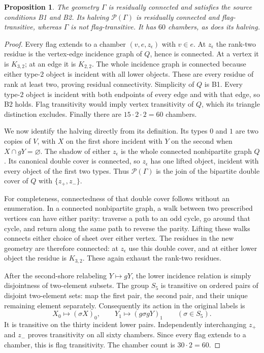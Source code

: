 \documentclass[11pt,a4paper]{article}
\newtheorem{proposition}[lemma]{Proposition}
\begin{document}
\begin{proposition}\label{example}
The geometry $\Gamma$ is residually connected and satisfies the
source conditions B1 and B2. Its halving $\mathcal P(\Gamma)$ is
residually connected and flag-transitive, whereas $\Gamma$ is not
flag-transitive. It has $60$ chambers, as does its halving.
\end{proposition}
\begin{proof}
Every flag extends to a chamber $(v,e,z_\epsilon)$ with $v\in e$.
At $z_\epsilon$ the rank-two residue is the vertex-edge incidence
graph of $Q$, hence is connected. At a vertex it is $K_{3,2}$;
at an edge it is $K_{2,2}$. The whole incidence graph is connected
because either type-$2$ object is incident with all lower objects.
These are every residue of rank at least two, proving residual
connectivity. Simplicity of $Q$ is B1. Every type-$2$ object is
incident with both endpoints of every edge and with that edge, so
B2 holds. Flag transitivity would imply vertex transitivity of $Q$,
which its triangle distinction excludes. Finally there are
$15\cdot2\cdot2=60$ chambers.

We now identify the halving directly from its definition. Its types
$0$ and $1$ are two copies of $V$, with $X$ on the first shore
incident with $Y$ on the second when $X\cap gY=\varnothing$.
The shadow of either $z_\epsilon$ is the whole connected
nonbipartite graph $Q$. Its canonical double cover is connected,
so $z_\epsilon$ has one lifted object, incident with every object
of the first two types. Thus $\mathcal P(\Gamma)$ is the join of
the bipartite double cover of $Q$ with $\{z_+,z_-\}$.

For completeness, connectedness of that double cover follows without
an enumeration. In a connected nonbipartite graph, a walk between
two prescribed vertices can have either parity: traverse a path to
an odd cycle, go around that cycle, and return along the same path
to reverse the parity. Lifting these walks connects either choice
of sheet over either vertex. The residues in the new geometry are
therefore connected: at $z_\epsilon$ use this double cover, and at
either lower object the residue is $K_{3,2}$. These again exhaust
the rank-two residues.

After the second-shore relabeling $Y\mapsto gY$, the lower incidence
relation is simply disjointness of two-element subsets. The group
$S_5$ is transitive on ordered pairs of disjoint two-element sets:
map the first pair, the second pair, and their unique remaining
element separately. Consequently its action in the original labels
is
\[
 X_0\mapsto(\sigma X)_0,\qquad
 Y_1\mapsto(g\sigma gY)_1\qquad(\sigma\in S_5).
\]
It is transitive on the thirty incident lower pairs. Independently
interchanging $z_+$ and $z_-$ proves transitivity on all sixty
chambers. Since every flag extends to a chamber, this is flag
transitivity. The chamber count is $30\cdot2=60$.
\end{proof}
\end{document}
